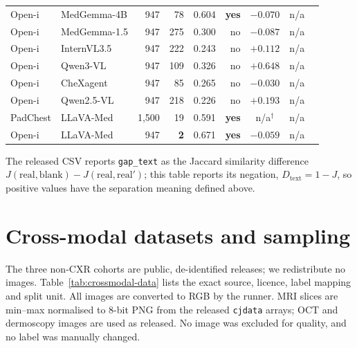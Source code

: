 \begin{table}[H]
\begin{tabular}{llrrrrcrr}
\midrule
Open-i & MedGemma-4B & 947 & 78 & 0.604 & \textbf{yes} & $-0.070$ & n/a \\
Open-i & MedGemma-1.5 & 947 & 275 & 0.300 & no & $-0.087$ & n/a \\
Open-i & InternVL3.5 & 947 & 222 & 0.243 & no & $+0.112$ & n/a \\
Open-i & Qwen3-VL & 947 & 109 & 0.326 & no & $+0.648$ & n/a \\
Open-i & CheXagent & 947 & 85 & 0.265 & no & $-0.030$ & n/a \\
Open-i & Qwen2.5-VL & 947 & 218 & 0.226 & no & $+0.193$ & n/a \\
\midrule
PadChest & LLaVA-Med & 1,500 & 19 & 0.591 & \textbf{yes} & n/a$^{\dagger}$ & n/a \\
Open-i & LLaVA-Med & 947 & \textbf{2} & 0.671 & \textbf{yes} & $-0.059$ & n/a \\
\bottomrule
\end{tabular}
\end{table}

The released CSV reports \texttt{gap\_text} as the Jaccard similarity difference
$J(\text{real},\text{blank}) - J(\text{real},\text{real}')$; this table reports its
negation, $D_{\text{text}}=1-J$, so positive values have the separation meaning
defined above.



\section{Cross-modal datasets and sampling}
\label{app:crossmodal-data}

The three non-CXR cohorts are public, de-identified releases; we redistribute no images.
Table~\ref{tab:crossmodal-data} lists the exact source, licence, label mapping and split
unit. All images are converted to RGB by the runner. MRI slices are min--max normalised to
8-bit PNG from the released \texttt{cjdata} arrays; OCT and dermoscopy images are used as
released. No image was excluded for quality, and no label was manually changed.

